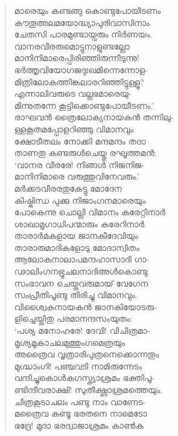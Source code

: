 \begin{verse}
മാരെയും കണ്ടങ്ങു കൊണ്ടുപോയീടണം\\
കൗതൂഅലമയോദ്ധ്യാപുരിവാസിനാം\\
ചേതസി പാരമുണ്ടായ്വരും നിര്‍ണയം.\\
വാനരവീരരുമൊട്ടുനാളുണ്ടല്ലോ\\
മാനിനിമാരെപ്പിരിഞ്ഞിരുന്നീടുന്നു!\\
ഭര്‍ത്തൃവിയോഗജദുഃഖമിന്നെന്നോള-\\
മിത്രിലോകത്തിങ്കലാരറിഞ്ഞിട്ടുള്ളൂ?\\
എന്നാലിവരുടെ വല്ലഭമാരെയു-\\
മിന്നുതന്നേ കൂട്ടിക്കൊണ്ടുപോയീടണം.’\\
രാഘവന്‍ ത്രൈലോക്യനായകന്‍ തന്നിലു-\\
ള്ളകൂതമപ്പോളറിഞ്ഞു വിമാനവും\\
ക്ഷോടീതലം നോക്കി മന്ദമന്ദം തദാ\\
താണതു കണ്ടരുള്‍ചെയ്തു രഘൂത്തമന്‍:\\
‘വാനര വീരരേ! നിങ്ങള്‍ നിജനിജ-\\
മാനിനിമാരെ വരുത്തുവിനേവരും.’\\
മര്‍ക്കടവീരരതുകേട്ടു മോദേന\\
കിഷ്കിന്ധ പുക്കു നിജാംഗനമാരെയും\\
പോകെന്നു ചൊല്ലി വിമാനം കരേറ്റിനാര്‍\\
ശാഖാമൃഗാധിപന്മാരും കരേറിനാര്‍.\\
താരാര്‍മകളായ ജാനകീദേവിയും\\
താരാരുമാദികളോടു മോദാന്വിതം\\
ആലോകനാലാപമന്ദഹാസാദി ഗാ-\\
ഢാലിംഗനഭ്രൂചലനാദിഅള്‍കൊണ്ടു\\
സംഭാവന ചെയ്തവരുമായ് വേഗേന\\
സംപ്രീതിപൂണ്ടു തിരിച്ചു വിമാനവും.\\
വിശ്വൈകനായകന്‍ ജാനകിയോടരു-\\
ളിച്ചെയ്തിതു പരമാനന്ദസംയുതം:\\
‘പശ്യ മനോഹരേ! ദേവി! വിചിത്രമാ-\\
മൃശ്യമൂകാചലമുത്തുംഗമെത്രയും\\
അത്രൈവ വൃത്രാരിപുത്രനെക്കൊന്നതും\\
മുഗ്ദ്ധാംഗി! പഞ്ചവടി നാമിരുന്നേടം\\
വന്ദിച്ചുകൊള്‍കഗസ്ത്യാശ്രമം ഭക്തിപൂ-\\
ണ്ടിന്ദീവരാക്ഷി! സുതീക്ഷ്ണാശ്രമത്തെയും.\\
ചിത്രകൂടാചലം പണ്ടു നാം വാണേട-\\
മത്രൈവ കണ്ടൂ ഭരതനെ നാമെടോ\\
ഭദ്രേ! മുദാ ഭരദ്വാജാശ്രമം കാണ്‍ക\\

\end{verse}
